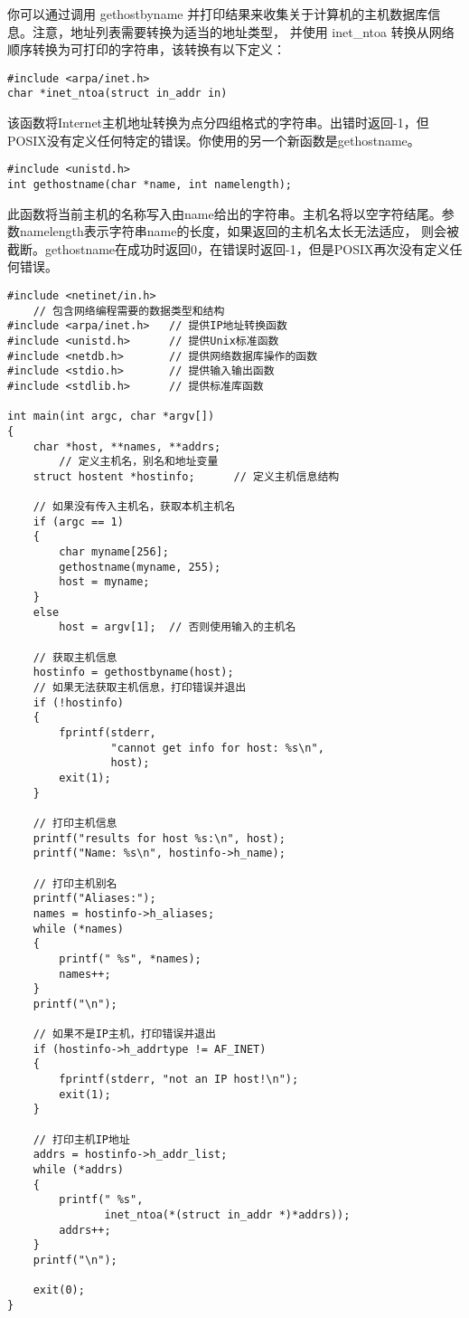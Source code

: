 \documentclass{ctexart}
\begin{document}
你可以通过调用 gethostbyname 并打印结果来收集关于计算机的主机数据库信息。注意，地址列表需要转换为适当的地址类型，
并使用 inet\_ntoa 转换从网络顺序转换为可打印的字符串，该转换有以下定义：  
\begin{verbatim}  
#include <arpa/inet.h>  
char *inet_ntoa(struct in_addr in)  
\end{verbatim}  
该函数将Internet主机地址转换为点分四组格式的字符串。出错时返回-1，但POSIX没有定义任何特定的错误。你使用的另一个新函数是gethostname。  
\begin{verbatim}  
#include <unistd.h>  
int gethostname(char *name, int namelength);  
\end{verbatim}  
此函数将当前主机的名称写入由name给出的字符串。主机名将以空字符结尾。参数namelength表示字符串name的长度，如果返回的主机名太长无法适应，
则会被截断。gethostname在成功时返回0，在错误时返回-1，但是POSIX再次没有定义任何错误。  

\begin{lstlisting}
#include <netinet/in.h>  
    // 包含网络编程需要的数据类型和结构  
#include <arpa/inet.h>   // 提供IP地址转换函数  
#include <unistd.h>      // 提供Unix标准函数  
#include <netdb.h>       // 提供网络数据库操作的函数  
#include <stdio.h>       // 提供输入输出函数  
#include <stdlib.h>      // 提供标准库函数  
  
int main(int argc, char *argv[])  
{  
    char *host, **names, **addrs;  
        // 定义主机名，别名和地址变量  
    struct hostent *hostinfo;      // 定义主机信息结构  
  
    // 如果没有传入主机名，获取本机主机名  
    if (argc == 1)  
    {  
        char myname[256];  
        gethostname(myname, 255);  
        host = myname;  
    }  
    else  
        host = argv[1];  // 否则使用输入的主机名  
  
    // 获取主机信息  
    hostinfo = gethostbyname(host);  
    // 如果无法获取主机信息，打印错误并退出  
    if (!hostinfo)  
    {  
        fprintf(stderr, 
                "cannot get info for host: %s\n", 
                host);  
        exit(1);  
    }  
  
    // 打印主机信息  
    printf("results for host %s:\n", host);  
    printf("Name: %s\n", hostinfo->h_name);  
  
    // 打印主机别名  
    printf("Aliases:");  
    names = hostinfo->h_aliases;  
    while (*names)  
    {  
        printf(" %s", *names);  
        names++;  
    }  
    printf("\n");  
  
    // 如果不是IP主机，打印错误并退出  
    if (hostinfo->h_addrtype != AF_INET)  
    {  
        fprintf(stderr, "not an IP host!\n");  
        exit(1);  
    }  
  
    // 打印主机IP地址  
    addrs = hostinfo->h_addr_list;  
    while (*addrs)  
    {  
        printf(" %s", 
               inet_ntoa(*(struct in_addr *)*addrs));  
        addrs++;  
    }  
    printf("\n");  
  
    exit(0);  
}      
\end{lstlisting}
\end{document}
